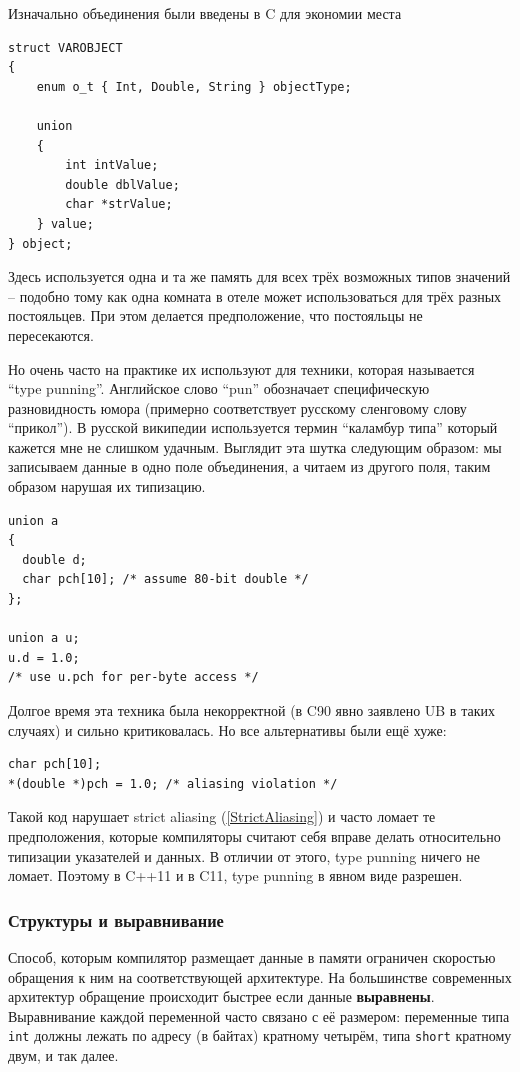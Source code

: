 \documentclass[a4paper,12pt,oneside]{article}
\begin{document}
Изначально объединения были введены в C для экономии места

\begin{lstlisting}
struct VAROBJECT
{
    enum o_t { Int, Double, String } objectType;

    union
    {
        int intValue;
        double dblValue;
        char *strValue;
    } value;
} object;
\end{lstlisting}

Здесь используется одна и та же память для всех трёх возможных типов значений -- подобно тому как одна комната в отеле может использоваться для трёх разных постояльцев. При этом делается предположение, что постояльцы не пересекаются.

Но очень часто на практике их используют для техники, которая называется ``type punning''. Английское слово ``pun'' обозначает специфическую разновидность юмора (примерно соответствует русскому сленговому слову ``прикол''). В русской википедии используется термин ``каламбур типа'' который кажется мне не слишком удачным. Выглядит эта шутка следующим образом: мы записываем данные в одно поле объединения, а читаем из другого поля, таким образом нарушая их типизацию.

\begin{lstlisting}
union a
{
  double d;
  char pch[10]; /* assume 80-bit double */
};

union a u;
u.d = 1.0;
/* use u.pch for per-byte access */
\end{lstlisting}

Долгое время эта техника была некорректной (в C90 явно заявлено UB в таких случаях) и сильно критиковалась. Но все альтернативы были ещё хуже:

\begin{lstlisting}
char pch[10];
*(double *)pch = 1.0; /* aliasing violation */
\end{lstlisting}

Такой код нарушает strict aliasing (\ref{StrictAliasing}) и часто ломает те предположения, которые компиляторы считают себя вправе делать относительно типизации указателей и данных. В отличии от этого, type punning ничего не ломает. Поэтому в C++11 и в C11, type punning в явном виде разрешен.

\subsubsection{Структуры и выравнивание}

Способ, которым компилятор размещает данные в памяти ограничен скоростью обращения к ним на соответствующей архитектуре. На большинстве современных архитектур обращение происходит быстрее если данные \textbf{выравнены}. Выравнивание каждой переменной часто связано с её размером: переменные типа \lstinline!int! должны лежать по адресу (в байтах) кратному четырём, типа \lstinline!short! кратному двум, и так далее.
\end{document}
